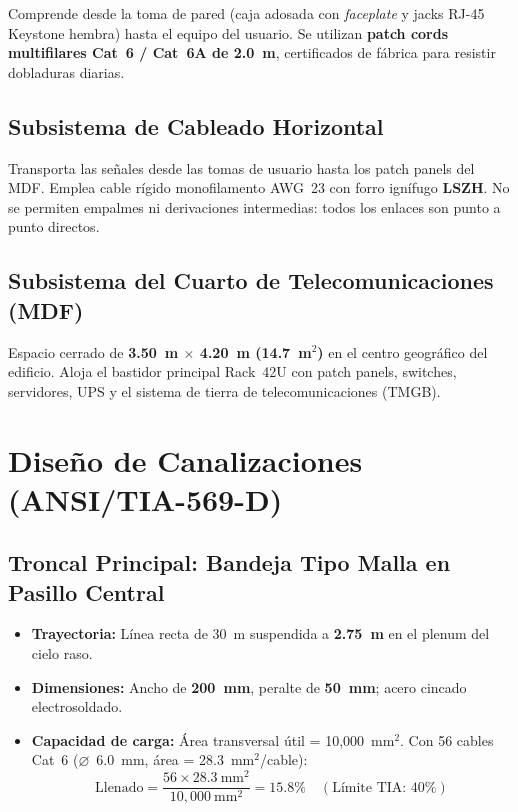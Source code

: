 Comprende desde la toma de pared (caja adosada con \textit{faceplate} y jacks RJ-45 Keystone hembra) hasta el equipo del usuario. Se utilizan \textbf{patch cords multifilares Cat~6 / Cat~6A de 2.0~m}, certificados de fábrica para resistir dobladuras diarias.

\subsection{Subsistema de Cableado Horizontal}

Transporta las señales desde las tomas de usuario hasta los patch panels del MDF. Emplea cable rígido monofilamento AWG~23 con forro ignífugo \textbf{LSZH}. No se permiten empalmes ni derivaciones intermedias: todos los enlaces son punto a punto directos.

\subsection{Subsistema del Cuarto de Telecomunicaciones (MDF)}

Espacio cerrado de \textbf{3.50~m $\times$ 4.20~m (14.7~m$^2$)} en el centro geográfico del edificio. Aloja el bastidor principal Rack~42U con patch panels, switches, servidores, UPS y el sistema de tierra de telecomunicaciones (TMGB).

\section{Diseño de Canalizaciones (ANSI/TIA-569-D)}

\subsection{Troncal Principal: Bandeja Tipo Malla en Pasillo Central}

\begin{itemize}[leftmargin=*]
    \item \textbf{Trayectoria:} Línea recta de 30~m suspendida a \textbf{2.75~m} en el plenum del cielo raso.
    \item \textbf{Dimensiones:} Ancho de \textbf{200~mm}, peralte de \textbf{50~mm}; acero cincado electrosoldado.
    \item \textbf{Capacidad de carga:} Área transversal útil = 10{,}000~mm$^2$. Con 56 cables Cat~6 ($\varnothing$~6.0~mm, área = 28.3~mm$^2$/cable):
    \begin{equation}
        \text{Llenado} = \frac{56 \times 28.3~\text{mm}^2}{10{,}000~\text{mm}^2} = 15.8\% \quad (\text{Límite TIA: 40\%})
    \end{equation}
\end{itemize}

